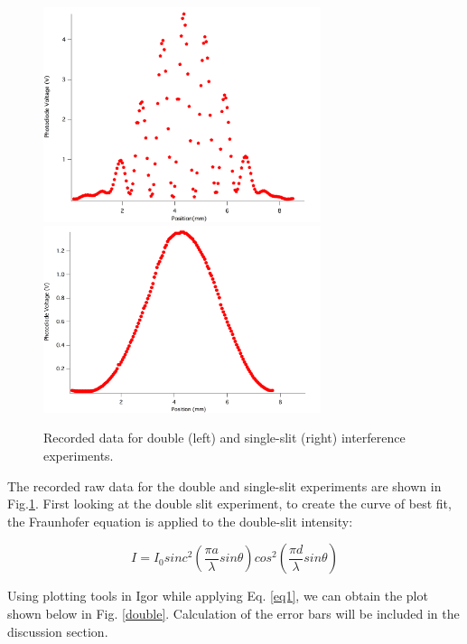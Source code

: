 \documentclass[prb,preprint]{revtex4-1}
\begin{document}
\begin{figure}[h]
\centering
\includegraphics[width=3.2in]{doubleres.png}
\includegraphics[width=3.2in]{singleres.png}
\caption{Recorded data for double (left) and single-slit (right) interference experiments.}
\label{ds}
\end{figure}

\newpage

The recorded raw data for the double and single-slit experiments are shown in Fig.\ref{ds}. First looking at the double slit experiment, to create the curve of best fit, the Fraunhofer equation is applied to the double-slit intensity: 

\begin{equation}
I=I_0 sinc^2( \frac{\pi a}{\lambda} sin \theta)  cos^2(\frac{\pi d}{\lambda} sin \theta)
\label{eq1}
\end{equation}

Using plotting tools in Igor while applying Eq. \ref{eq1}, we can obtain the plot shown below in Fig. \ref{double}. Calculation of the error bars will be included in the discussion section.
\end{document}
